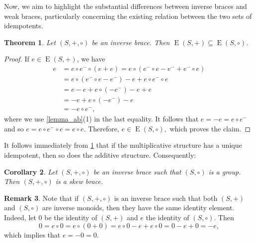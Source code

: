\documentclass[preprint,1p]{elsarticle}
\newtheorem{theor}{Theorem}[section]
\newtheorem{cor}[theor]{Corollary}
\theoremstyle{definition}               %
\newtheorem{rem}[theor]{Remark}
\DeclareMathOperator{\E}{E}
\begin{document}
Now, we aim to highlight the substantial differences between inverse braces and weak braces, particularly concerning the existing relation between the two sets of idempotents. %

\begin{theor}\label{prop_idemp}
    Let $(S,+,\circ)$ be an inverse brace. Then $\E(S, +) \subseteq \E(S, \circ)$.
\end{theor}
\begin{proof}
If $e \in \E(S,+)$, we have
\begin{align*}
    e&
=e\circ e^- \circ(e+e)=e\circ(e^-\circ e -e^-+e^-\circ e)\\
    &= e\circ (e^-\circ e-e^-) -e +e\circ e^-\circ e\\
    &=e-e+e\circ(-e^-)-e+e\\
    &=-e+e\circ(-e^-)-e\\
    &= - e\circ e^-,
\end{align*}
where we use \cref{lemma_ab}(1) in the last equality. It follows that $e=-e=e\circ e^-$ and so $e=e\circ e^-\circ e= e\circ e$.
 Therefore, $e \in \E(S,\circ),$ which proves the claim.
\end{proof}



\smallskip

    It follows immediately from \cref{prop_idemp} that if the multiplicative structure has a unique idempotent, then so does the additive structure. Consequently:
\begin{cor}\label{circ_gruppo}
Let $(S,+,\circ)$ be an inverse brace such that $(S,\circ)$ is a group. Then $(S, +, \circ)$ is a skew brace. 
\end{cor}

\smallskip

\begin{rem}
    Note that if $(S, +, \circ)$ is an inverse brace such that both $(S, +)$ and $(S, \circ)$ are inverse monoids, then they have the same identity element. Indeed, let $0$ be the identity of $(S,+)$ and $e$ the identity of $(S, \circ)$. Then
   $$0=e \circ 0=e \circ (0+0)=e \circ 0-e+e \circ 0=0-e+0=-e,$$
  which implies that $e=-0=0$. 
\end{rem}

\smallskip
\end{document}
